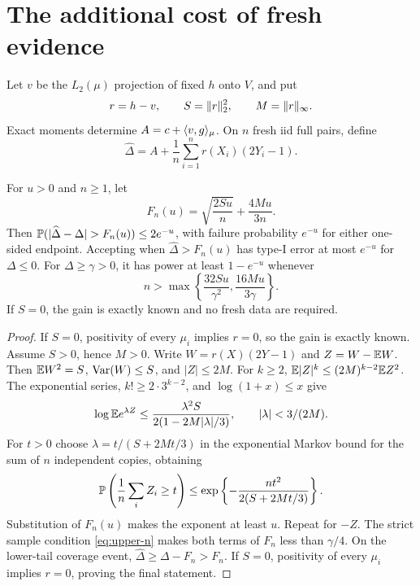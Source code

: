 \section{The additional cost of fresh evidence}
Let $v$ be the $L_2(\mu)$ projection of fixed $h$ onto $V$, and put
\[
 r=h-v,\qquad S=\lVert r\rVert_2^2,\qquad M=\lVert r\rVert_\infty.
\]
Exact moments determine $A=c+\langle v,g\rangle_\mu$. On $n$ fresh iid full pairs, define
\[
 \widehat\Delta=A+\frac1n\sum_{i=1}^n r(X_i)(2Y_i-1).
\]

\begin{theorem}\label{thm:upper}
For $u>0$ and $n\ge1$, let
\[
 F_n(u)=\sqrt{\frac{2Su}{n}}+\frac{4Mu}{3n}.
\]
Then $\PP(|\widehat\Delta-\Delta|>F_n(u))\le2e^{-u}$, with failure probability $e^{-u}$ for either one-sided endpoint. Accepting when $\widehat\Delta>F_n(u)$ has type-I error at most $e^{-u}$ for $\Delta\le0$. For $\Delta\ge\gamma>0$, it has power at least $1-e^{-u}$ whenever
\begin{equation}
 n>\max\left\{\frac{32Su}{\gamma^2},\frac{16Mu}{3\gamma}\right\}.
 \label{eq:upper-n}
\end{equation}
If $S=0$, the gain is exactly known and no fresh data are required.
\end{theorem}
\begin{proof}
If $S=0$, positivity of every $\mu_i$ implies $r=0$, so the gain is exactly known. Assume $S>0$, hence $M>0$. Write $W=r(X)(2Y-1)$ and $Z=W-\mathbb E W$. Then
$\mathbb E W^2=S$, $\operatorname{Var}(W)\le S$, and $|Z|\le2M$. For $k\ge2$,
$\mathbb E|Z|^k\le(2M)^{k-2}\mathbb E Z^2$. The exponential series, $k!\ge2\cdot3^{k-2}$, and $\log(1+x)\le x$ give
\[
 \log\mathbb E e^{\lambda Z}
 \le\frac{\lambda^2S}{2(1-2M|\lambda|/3)},
 \qquad |\lambda|<3/(2M).
\]
For $t>0$ choose $\lambda=t/(S+2Mt/3)$ in the exponential Markov bound for the sum of $n$ independent copies, obtaining
\[
 \mathbb P\left(\frac1n\sum_i Z_i\ge t\right)
 \le\exp\left\{-\frac{nt^2}{2(S+2Mt/3)}\right\}.
\]
Substitution of $F_n(u)$ makes the exponent at least $u$. Repeat for $-Z$. The strict sample condition \eqref{eq:upper-n} makes both terms of $F_n$ less than $\gamma/4$. On the lower-tail coverage event, $\widehat\Delta\ge\Delta-F_n>F_n$. If $S=0$, positivity of every $\mu_i$ implies $r=0$, proving the final statement.
\end{proof}

